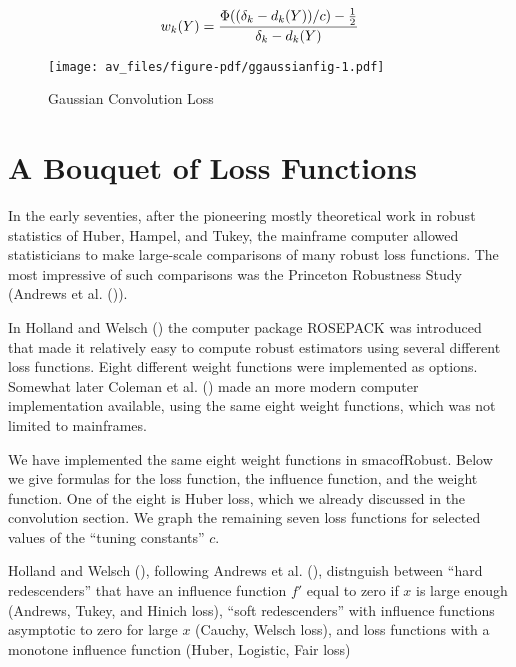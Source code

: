 \documentclass[
  12pt,
  letterpaper,
  DIV=11,
  numbers=noendperiod]{scrartcl}
\newcommand{\sectionbreak}{\pagebreak}
\theoremstyle{plain}
\theoremstyle{plain}
\theoremstyle{plain}
\theoremstyle{definition}
\theoremstyle{remark}
\begin{document}
\[
w_k(Y)=
\frac{\Phi((\delta_k-d_k(Y))/c)-\frac12}{\delta_k-d_k(Y)}\\
\]

\begin{figure}[H]

{\centering \texttt{[image: av\_files/figure-pdf/ggaussianfig-1.pdf]}

}

\caption{Gaussian Convolution Loss}

\end{figure}%

\sectionbreak

\section{A Bouquet of Loss Functions}\label{a-bouquet-of-loss-functions}

In the early seventies, after the pioneering mostly theoretical work in
robust statistics of Huber, Hampel, and Tukey, the mainframe computer
allowed statisticians to make large-scale comparisons of many robust
loss functions. The most impressive of such comparisons was the
Princeton Robustness Study (Andrews et al.
()).

In Holland and Welsch () the
computer package ROSEPACK was introduced that made it relatively easy to
compute robust estimators using several different loss functions. Eight
different weight functions were implemented as options. Somewhat later
Coleman et al.
() made an
more modern computer implementation available, using the same eight
weight functions, which was not limited to mainframes.

We have implemented the same eight weight functions in smacofRobust.
Below we give formulas for the loss function, the influence function,
and the weight function. One of the eight is Huber loss, which we
already discussed in the convolution section. We graph the remaining
seven loss functions for selected values of the ``tuning constants''
\(c\).

Holland and Welsch (), following
Andrews et al.
(),
distnguish between ``hard redescenders'' that have an influence function
\(f'\) equal to zero if \(x\) is large enough (Andrews, Tukey, and
Hinich loss), ``soft redescenders'' with influence functions asymptotic
to zero for large \(x\) (Cauchy, Welsch loss), and loss functions with a
monotone influence function (Huber, Logistic, Fair loss)
\end{document}

